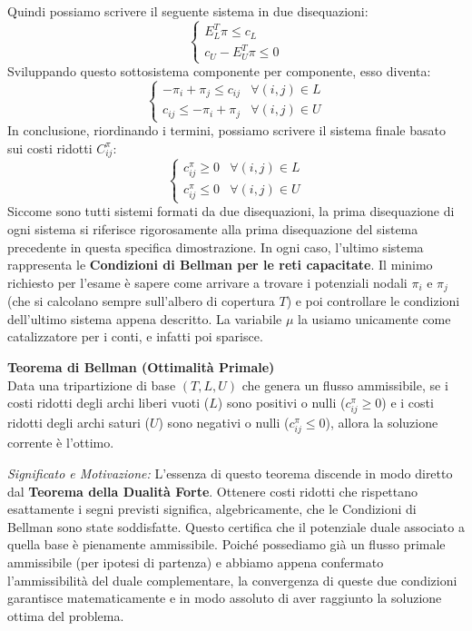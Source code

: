 \documentclass[12pt, a4paper]{article}
\begin{document}
	Quindi possiamo scrivere il seguente sistema in due disequazioni:
	\[
	\begin{cases}
		E_L^T \pi \le c_L \\
		c_U - E_U^T \pi \le 0
	\end{cases}
	\]
	Sviluppando questo sottosistema componente per componente, esso diventa:
	\[
	\begin{cases}
		-\pi_i + \pi_j \le c_{ij} & \forall (i,j) \in L \\
		c_{ij} \le -\pi_i + \pi_j & \forall (i,j) \in U
	\end{cases}
	\]
	In conclusione, riordinando i termini, possiamo scrivere il sistema finale basato sui costi ridotti $C^{\pi}_{ij}$:
	\[
	\begin{cases}
		c^{\pi}_{ij} \ge 0 & \forall (i,j) \in L \\
		c^{\pi}_{ij} \le 0 & \forall (i,j) \in U
	\end{cases}
	\]
	Siccome sono tutti sistemi formati da due disequazioni, la prima disequazione di ogni sistema si riferisce rigorosamente alla prima disequazione del sistema precedente in questa specifica dimostrazione. In ogni caso, l'ultimo sistema rappresenta le \textbf{Condizioni di Bellman per le reti capacitate}. 
	Il minimo richiesto per l'esame è sapere come arrivare a trovare i potenziali nodali $\pi_i$ e $\pi_j$ (che si calcolano sempre sull'albero di copertura $T$) e poi controllare le condizioni dell'ultimo sistema appena descritto. La variabile $\mu$ la usiamo unicamente come catalizzatore per i conti, e infatti poi sparisce.
	
	\vspace{0.4cm}
	\textbf{Teorema di Bellman (Ottimalità Primale)}\\
	Data una tripartizione di base $(T, L, U)$ che genera un flusso ammissibile, se i costi ridotti degli archi liberi vuoti ($L$) sono positivi o nulli ($c^{\pi}_{ij} \ge 0$) e i costi ridotti degli archi saturi ($U$) sono negativi o nulli ($c^{\pi}_{ij} \le 0$), allora la soluzione corrente è l'ottimo. 
	
	\textit{Significato e Motivazione:} L'essenza di questo teorema discende in modo diretto dal \textbf{Teorema della Dualità Forte}. Ottenere costi ridotti che rispettano esattamente i segni previsti significa, algebricamente, che le Condizioni di Bellman sono state soddisfatte. Questo certifica che il potenziale duale associato a quella base è pienamente ammissibile. Poiché possediamo già un flusso primale ammissibile (per ipotesi di partenza) e abbiamo appena confermato l'ammissibilità del duale complementare, la convergenza di queste due condizioni garantisce matematicamente e in modo assoluto di aver raggiunto la soluzione ottima del problema.
	
\end{document}
